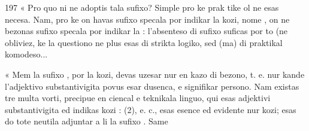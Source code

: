 \begin{VUpage}[201]{197}
« Pro quo ni ne adoptis tala sufixo? Simple pro ke prak\cc
tike ol ne esas necesa. Nam, pro ke on havas sufixo specala\nl
por indikar la kozi, nome , on ne bezonas sufixo specala\nl
por indikar la  : l'absenteso di sufixo suficas por to\nl
(ne obliviez, ke la questiono ne plus esas di strikta logiko,\nl
sed (ma) di praktikal komodeso...

« Mem la sufixo , por la kozi, devas uzesar nur en\nl
kazo di bezono, t. e. nur kande l'adjektivo substantivigita\nl
povus esar dusenca, e signifikar persono. Nam existas tre\nl
multa vorti, precipue en ciencal e teknikala linguo, qui\nl
esas adjektivi substantivigita ed indikas kozi : \nl
{} (2), e. c., esas esence ed evidente nur\nl
kozi; esas do tote neutila adjuntar a li la sufixo . Same\parplein
\end{VUpage}


